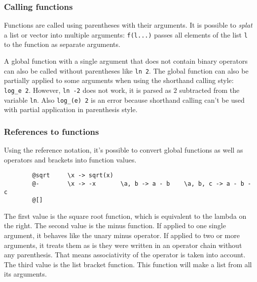 \documentclass[10pt]{article}
\begin{document}
    \subsubsection{Calling functions}
    Functions are called using parentheses with their arguments.
    It is possible to \textsl{splat} a list or vector into multiple arguments:
    \verb|f(l...)| passes all elements of the list \verb|l| to the function as separate arguments.
    
    A global function with a single argument that does not contain binary operators can also be called without parentheses like \verb|ln 2|.
    The global function can also be partially applied to some arguments when using the shorthand calling style: \verb|log_e 2|.
    However, \verb|ln -2| does not work, it is parsed as $ 2 $ subtracted from the variable \verb|ln|.
    Also \verb|log_(e) 2| is an error because shorthand calling can't be used with partial application in parenthesis style.

    \subsubsection{References to functions}
    Using the reference notation, it's possible to convert global functions as well as operators and brackets into function values.
    \begin{verbatim}
        @sqrt     \x -> sqrt(x)
        @-        \x -> -x       \a, b -> a - b    \a, b, c -> a - b - c
        @[]
    \end{verbatim}
    The first value is the square root function, which is equivalent to the lambda on the right.
    The second value is the minus function.
    If applied to one single argument, it behaves like the unary minus operator.
    If applied to two or more arguments, it treats them as is they were written in an operator chain without any parenthesis.
    That means associativity of the operator is taken into account.
    The third value is the list bracket function.
    This function will make a list from all its arguments.
    
\end{document}
